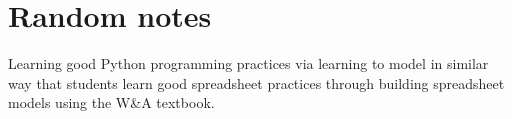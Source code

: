 \documentclass[ited,blindrev]{informs3}              %
\begin{document}
\section{Random notes}
Learning good Python programming practices via learning to model in similar way that students learn good spreadsheet practices through building spreadsheet models using the W\&A textbook.




\ACKNOWLEDGMENT{%
}%


%
%
%




\end{document}

